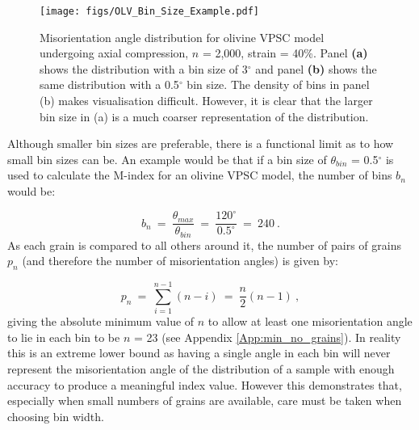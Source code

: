 \documentclass[a4paper,12pt,twoside]{report}
\numberwithin{equation}{chapter}
\begin{document}
\begin{figure}[h]
  \centering
    \texttt{[image: figs/OLV\_Bin\_Size\_Example.pdf]}
  \caption[Bin size example (olivine VPSC)]{Misorientation angle distribution for olivine VPSC model undergoing axial compression, $n$ = 2,000, strain = 40\%. Panel \textbf{(a)} shows the distribution with a bin size of 3$^\circ$ and panel \textbf{(b)} shows the same distribution with a 0.5$^\circ$ bin size. The density of bins in panel (b) makes visualisation difficult. However, it is clear that the larger bin size in (a) is a much coarser representation of the distribution.}
  \label{fig:OLV_bin_size_example}
\end{figure}  


Although smaller bin sizes are preferable, there is a functional limit as to how small bin sizes can be. An example would be that if a bin size of $\theta_{bin}$ = 0.5$^\circ$ is used to calculate the M-index for an olivine VPSC model, the number of bins $b_n$ would be:

\begin{equation}
b_n\ =\ \frac{\theta_{max}}{\theta_{bin}}\ =\ \frac{120^\circ}{0.5^\circ}\ =\ 240\ . 
\end{equation}     
\noindent
As each grain is compared to all others around it, the number of pairs of grains $p_n$ (and therefore the number of misorientation angles) is given by:

\begin{equation}
p_n\ =\ \sum^{n-1}_{i=1}(n - i)\ =\ \frac{n}{2}(n-1)\ ,
\end{equation} 
\noindent
giving the absolute minimum value of $n$ to allow at least one misorientation angle to lie in each bin to be $n$ = 23 (see Appendix \ref{App:min_no_grains}). In reality this is an extreme lower bound as having a single angle in each bin will never represent the misorientation angle of the distribution of a sample with enough accuracy to produce a meaningful index value. However this demonstrates that, especially when small numbers of grains are available, care must be taken when choosing bin width. 
\end{document}
